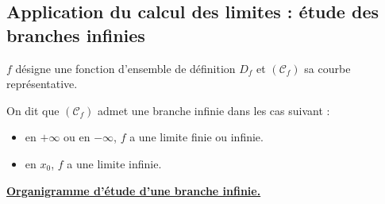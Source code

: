 
\subsection{Application du calcul des limites : étude des branches infinies}
$f$ désigne une fonction d'ensemble de définition $D_f$ et $(\mathcal{C}_f)$ sa courbe représentative.
\par On dit que $(\mathcal{C}_f)$ admet une branche infinie dans les cas suivant :
\begin{itemize}
	\item en $+\infty$ ou en $-\infty$, $f$ a une limite finie ou infinie.
	\item en $x_0$, $f$ a une limite infinie.
\end{itemize}%
\begin{center}
	\textbf{\textsf{\uline{Organigramme d'étude d'une branche infinie.}}}
\end{center}
%
